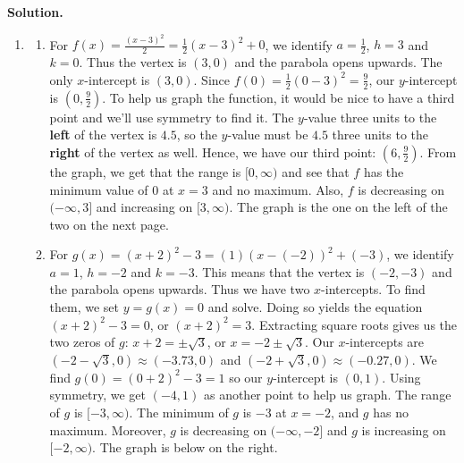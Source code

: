 \begin{ex}
\begin{enumerate}
\begin{center}
\end{center}

\end{enumerate}

\vspace*{-.15in}

\enlargethispage{.1in}

{\bf Solution.}

\begin{enumerate}

\item

\begin{enumerate}

\item For $f(x) = \frac{(x-3)^2}{2}  = \frac{1}{2} (x-3)^2+0$, we identify $a = \frac{1}{2}$, $h = 3$ and $k = 0$.  Thus the vertex is $(3,0)$ and the parabola opens upwards.  The only $x$-intercept is $(3,0)$.  Since $f(0) = \frac{1}{2} (0-3)^2 = \frac{9}{2}$, our $y$-intercept is $\left(0, \frac{9}{2}\right)$.  To help us graph the function, it would be nice to have a third point and we'll use symmetry to find it.  The $y$-value three units to the \textbf{left} of the vertex is $4.5$, so the $y$-value must be $4.5$ three units to the \textbf{right} of the vertex as well.  Hence, we have our third point:  $\left(6, \frac{9}{2}\right)$.  From the graph, we get that the range is $[0, \infty)$ and see that $f$ has the minimum value of $0$ at $x = 3$ and no maximum.  Also, $f$ is decreasing on $(-\infty, 3]$ and increasing on $[3, \infty)$.  The graph is the one on the left of the two on the next page.

\item For $g(x) = (x+2)^2 - 3 = (1)(x-(-2))^2+(-3)$, we identify $a = 1$, $h = -2$ and $k = -3$.  This means that the vertex is $(-2,-3)$ and the parabola opens upwards.  Thus we have two $x$-intercepts. To find them, we set $y = g(x) = 0$ and solve.  Doing so yields the equation $(x+2)^2 - 3 = 0$, or $(x+2)^2 = 3$.  Extracting square roots gives us the two zeros of $g$:  $x + 2 = \pm \sqrt{3}$, or $x = -2 \pm \sqrt{3}$.  Our $x$-intercepts are $(-2-\sqrt{3}, 0) \approx (-3.73, 0)$ and $(-2+\sqrt{3}, 0) \approx (-0.27, 0)$.  We find $g(0) = (0+2)^2-3 = 1$ so our $y$-intercept is $(0,1)$.  Using symmetry, we get $(-4,1)$ as another point to help us graph.  The range of $g$ is $[-3, \infty)$.  The minimum of $g$ is $-3$ at $x = -2$, and $g$ has no maximum. Moreover, $g$ is decreasing on $(-\infty, -2]$ and $g$ is increasing on $[-2, \infty)$.  The graph is below on the right.


\end{enumerate}
\end{enumerate}
\end{ex}
